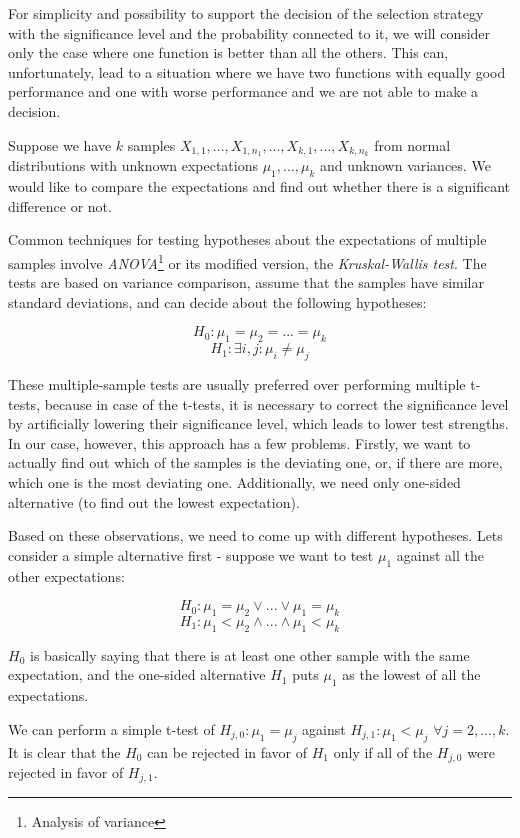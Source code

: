 For simplicity and possibility to support the decision of the selection strategy with the significance level and the probability connected to it, we will consider only the case where one function is better than all the others. This can, unfortunately, lead to a situation where we have two functions with equally good performance and one with worse performance and we are not able to make a decision.

Suppose we have $k$ samples $X_{1,1}, ..., X_{1, n_1}, ..., X_{k,1}, ..., X_{k, n_k}$ from normal distributions with unknown expectations $\mu_1, ..., \mu_k$ and unknown variances. We would like to compare the expectations and find out whether there is a significant difference or not.

Common techniques for testing hypotheses about the expectations of multiple samples involve \textit{ANOVA}\footnote{Analysis of variance} or its modified version, the \textit{Kruskal-Wallis test}. The tests are based on variance comparison, assume that the samples have similar standard deviations, and can decide about the following hypotheses:


\[
H_0: \mu_1 = \mu_2 = ... = \mu_k
\]
\[
H_1: \exists i, j: \mu_i \neq \mu_j
\]

These multiple-sample tests are usually preferred over performing multiple t-tests, because in case of the t-tests, it is necessary to correct the significance level by artificially lowering their significance level, which leads to lower test strengths. In our case, however, this approach has a few problems. Firstly, we want to actually find out which of the samples is the deviating one, or, if there are more, which one is the most deviating one. Additionally, we need only one-sided alternative (to find out the lowest expectation). 

Based on these observations, we need to come up with different hypotheses. Lets consider a simple alternative first - suppose we want to test $\mu_1$ against all the other expectations:

\[
H_0: \mu_1 = \mu_2 \vee ... \vee \mu_1 = \mu_k
\]
\[
H_1: \mu_1 < \mu_2 \wedge ... \wedge \mu_1 < \mu_k
\]

$H_0$ is basically saying that there is at least one other sample with the same expectation, and the one-sided alternative $H_1$ puts $\mu_1$ as the lowest of all the expectations.

We can perform a simple t-test of $H_{j,0}: \mu_1 = \mu_j$ against $H_{j,1}: \mu_1 < \mu_j$ $\forall j = 2, ..., k$. It is clear that the $H_0$ can be rejected in favor of $H_1$ only if all of the $H_{j,0}$ were rejected in favor of $H_{j,1}$. 

